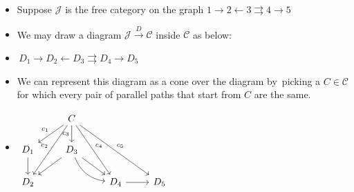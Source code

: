 \begin{itemize}
    \item Suppose $\mathcal{J}$ is the free category on the graph $\boxed{1 \rightarrow 2 \leftarrow 3 \rightrightarrows 4 \rightarrow 5}$
    \item We may draw a diagram $\mathcal{J}\xrightarrow{D}\mathcal{C}$ inside $\mathcal{C}$ as below:
    \item \,$\boxed{D_1 \rightarrow D_2 \leftarrow D_3 \rightrightarrows D_4 \rightarrow D_5}$\,
    \item We can represent this diagram as a cone over the diagram by \,picking a $C \in \mathcal{C}$ for which every pair of parallel paths that start from $C$ are the same.
    \item $\begin{tikzcd}              & C \arrow[d, "c_3"'] \arrow[ld, "c_1"'] \arrow[ldd, "c_2"']\arrow[rdd, "c_4"] \arrow[rrdd, "c_5"] &               &     \\D_1 \arrow[d] & D_3 \arrow[ld] \arrow[rd] \arrow[rd, bend right]                                                  &               &     \\D_2         &                                                                                                  & D_4 \arrow[r] & D_5\end{tikzcd}$\,
  \end{itemize}
